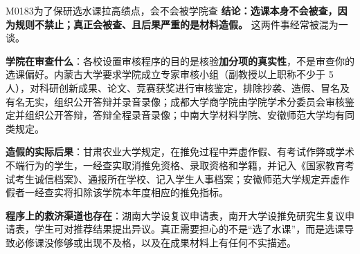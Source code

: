 \begin{qa}{M0183}{为了保研选水课拉高绩点，会不会被学院查}
\textbf{结论：选课本身不会被查，因为规则不禁止；真正会被查、且后果严重的是材料造假。} 这两件事经常被混为一谈。

\textbf{学院在审查什么}：各校设置审核程序的目的是核验\textbf{加分项的真实性}，不是审查你的选课偏好。内蒙古大学要求学院成立专家审核小组（副教授以上职称不少于 5 人），对科研创新成果、论文、竞赛获奖进行审核鉴定，排除抄袭、造假、冒名及有名无实，组织公开答辩并录音录像；成都大学商学院由学院学术分委员会审核鉴定并组织公开答辩，答辩全程录音录像；中南大学材料学院、安徽师范大学均有同类规定。

\textbf{造假的实际后果}：甘肃农业大学规定，在推免过程中弄虚作假、有考试作弊或学术不端行为的学生，一经查实取消推免资格、录取资格和学籍，并记入《国家教育考试考生诚信档案》、通报所在学校、记入学生人事档案；安徽师范大学规定弄虚作假者一经查实将扣除该学院本年度相应的推免指标。

\textbf{程序上的救济渠道也存在}：湖南大学设复议申请表，南开大学设推免研究生复议申请表，学生可对推荐结果提出异议。真正需要担心的不是“选了水课”，而是选课导致必修课没修够或出现不及格，以及在成果材料上有任何不实描述。
\end{qa}

